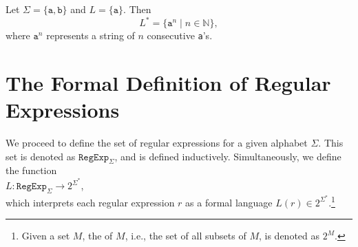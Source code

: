 \exampleEng
Let $ \Sigma = \{ \texttt{a}, \texttt{b} \} $ and $ L = \{ \texttt{a} \} $. Then
\[
L^* = \{ \texttt{a}^n \mid n \in \mathbb{N} \},
\]
where $ \texttt{a}^n $ represents a string of $ n $ consecutive \texttt{a}'s. \eox



\section{The Formal Definition of Regular Expressions}
We proceed to define the set of regular expressions for a given alphabet $ \Sigma $. This set is denoted as
$ \texttt{RegExp}_\Sigma $, and is defined inductively. Simultaneously, we define the function 
\\[0.2cm]
\hspace*{1.3cm}
$L: \texttt{RegExp}_\Sigma \rightarrow 2^{\Sigma^*}$,
\\[0.2cm]
which interprets each regular expression $ r $ as a formal language $ L(r) \in 2^{\Sigma^*} $.\footnote{
  Given a set $ M $, the  of $ M $, i.e., the set of all subsets of $ M $, is denoted as $ 2^M $.
}
\pagebreak

